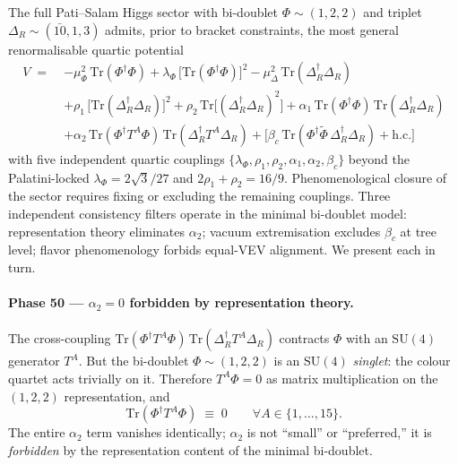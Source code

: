 \documentclass[11pt,a4paper]{article}
\theoremstyle{plain}
\theoremstyle{definition}
\theoremstyle{remark}
\begin{document}
The full Pati--Salam Higgs sector with bi-doublet
$\Phi \sim (1,2,2)$ and triplet $\Delta_R \sim (\bar{10}, 1, 3)$
admits, prior to bracket constraints, the most general renormalisable
quartic potential
\begin{equation}\label{eq:V-prepruning}
\begin{aligned}
  V \;=\;& -\mu_\Phi^2\,\mathrm{Tr}(\Phi^\dagger\Phi)
       + \lambda_\Phi\,\bigl[\mathrm{Tr}(\Phi^\dagger\Phi)\bigr]^2
       - \mu_\Delta^2\,\mathrm{Tr}(\Delta_R^\dagger\Delta_R) \\
       &+ \rho_1\,\bigl[\mathrm{Tr}(\Delta_R^\dagger\Delta_R)\bigr]^2
       + \rho_2\,\mathrm{Tr}\bigl[(\Delta_R^\dagger\Delta_R)^2\bigr]
       + \alpha_1\,\mathrm{Tr}(\Phi^\dagger\Phi)\,\mathrm{Tr}(\Delta_R^\dagger\Delta_R) \\
       &+ \alpha_2\,\mathrm{Tr}(\Phi^\dagger T^A \Phi)\,
         \mathrm{Tr}(\Delta_R^\dagger T^A \Delta_R)
       + \bigl[\beta_c\,\mathrm{Tr}(\Phi^\dagger \tilde{\Phi}\,\Delta_R^\dagger\Delta_R)
       + \mathrm{h.c.}\bigr]
\end{aligned}
\end{equation}
with five independent quartic couplings
$\{\lambda_\Phi, \rho_1, \rho_2, \alpha_1, \alpha_2, \beta_c\}$
beyond the Palatini-locked
$\lambda_\Phi = 2\sqrt{3}/27$ and $2\rho_1 + \rho_2 = 16/9$.
Phenomenological closure of the sector requires fixing or excluding
the remaining couplings.  Three independent consistency filters
operate in the minimal bi-doublet model:
representation theory eliminates $\alpha_2$;
vacuum extremisation excludes $\beta_c$ at tree level;
flavor phenomenology forbids equal-VEV alignment.
We present each in turn.

\paragraph{Phase 50 --- $\alpha_2 = 0$ forbidden by representation theory.}
The cross-coupling
$\mathrm{Tr}(\Phi^\dagger T^A \Phi)\,
 \mathrm{Tr}(\Delta_R^\dagger T^A \Delta_R)$
contracts $\Phi$ with an $\mathrm{SU}(4)$ generator $T^A$.  But the
bi-doublet $\Phi \sim (1, 2, 2)$ is an $\mathrm{SU}(4)$ \emph{singlet}:
the colour quartet acts trivially on it.  Therefore $T^A \Phi = 0$ as
matrix multiplication on the $(1,2,2)$ representation, and
\begin{equation}\label{eq:alpha2-zero}
  \mathrm{Tr}(\Phi^\dagger T^A \Phi) \;\equiv\; 0
  \qquad \forall A \in \{1,\ldots,15\}.
\end{equation}
The entire $\alpha_2$ term vanishes identically; $\alpha_2$ is not
``small'' or ``preferred,'' it is \emph{forbidden} by the representation
content of the minimal bi-doublet.
\end{document}
